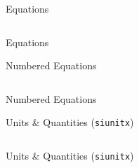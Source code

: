 \begin{frame}[fragile]{Equations}
    \begin{listing}
        \inputminted[fontsize=\scriptsize]{latex}{assets/tex/math/equations.tex}
        \caption{Inline and display math with equations}
    \end{listing}
\end{frame}

\begin{frame}{Equations}
    
\end{frame}

\begin{frame}[fragile]{Numbered Equations}
    \begin{listing}
        \inputminted[fontsize=\scriptsize]{latex}{assets/tex/math/numbered.tex}
        \caption{Numbered equations with labels and cross-references}
    \end{listing}
\end{frame}

\begin{frame}{Numbered Equations}
    
\end{frame}


\begin{frame}[fragile]{Units \& Quantities (\texttt{siunitx})}
    \begin{listing}
        \inputminted[fontsize=\scriptsize]{latex}{assets/tex/math/siunitx.tex}
        \caption{Consistent formatting with \texttt{siunitx}}
    \end{listing}
\end{frame}

\begin{frame}{Units \& Quantities (\texttt{siunitx})}
    
\end{frame}
